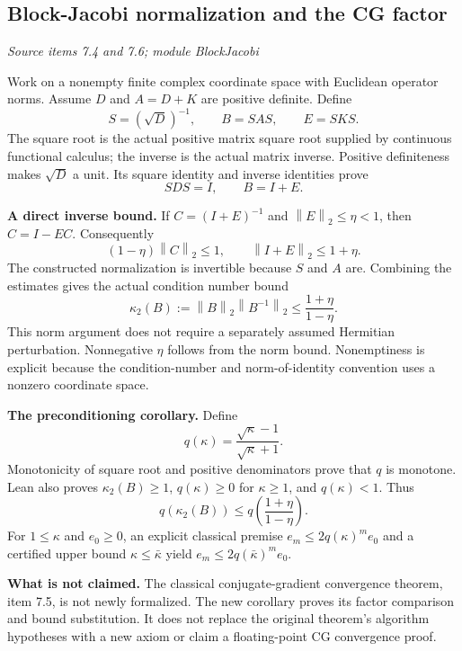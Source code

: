 \documentclass[11pt,letterpaper]{article}
\theoremstyle{definition}
\theoremstyle{remark}
\newcommand{\norm}[1]{\left\lVert#1\right\rVert}\newcommand{\abs}[1]{\left\lvert#1\right\rvert}
\begin{document}
\subsection{Block-Jacobi normalization and the CG factor}\label{supp5:subsection:006}\textit{Source items 7.4 and 7.6; module BlockJacobi}\par
Work on a nonempty finite complex coordinate space with Euclidean operator norms. Assume $D$ and $A=D+K$ are positive definite. Define
\[
S=(\sqrt D)^{-1},\qquad B=SAS,\qquad E=SKS.
\]
The square root is the actual positive matrix square root supplied by continuous functional calculus; the inverse is the actual matrix inverse. Positive definiteness makes $\sqrt D$ a unit. Its square identity and inverse identities prove
\[
SDS=I,\qquad B=I+E.
\]

\textbf{A direct inverse bound.} If $C=(I+E)^{-1}$ and $\norm E_2\leq\eta<1$, then $C=I-EC$. Consequently
\[
(1-\eta)\norm C_2\leq 1,
\qquad \norm{I+E}_2\leq 1+\eta.
\]
The constructed normalization is invertible because $S$ and $A$ are. Combining the estimates gives the actual condition number bound
\[
\boxed{\kappa_2(B):=\norm B_2\norm{B^{-1}}_2
\leq\frac{1+\eta}{1-\eta}.}
\]
This norm argument does not require a separately assumed Hermitian perturbation. Nonnegative $\eta$ follows from the norm bound. Nonemptiness is explicit because the condition-number and norm-of-identity convention uses a nonzero coordinate space.

\textbf{The preconditioning corollary.} Define
\[
q(\kappa)=\frac{\sqrt\kappa-1}{\sqrt\kappa+1}.
\]
Monotonicity of square root and positive denominators prove that $q$ is monotone. Lean also proves $\kappa_2(B)\geq1$, $q(\kappa)\geq0$ for $\kappa\geq1$, and $q(\kappa)<1$. Thus
\[
\boxed{q(\kappa_2(B))\leq q\!\left(\frac{1+\eta}{1-\eta}\right).}
\]
For $1\leq\kappa$ and $e_0\geq0$, an explicit classical premise $e_m\leq2q(\kappa)^m e_0$ and a certified upper bound $\kappa\leq\bar\kappa$ yield $e_m\leq2q(\bar\kappa)^m e_0$.

\textbf{What is not claimed.} The classical conjugate-gradient convergence theorem, item 7.5, is not newly formalized. The new corollary proves its factor comparison and bound substitution. It does not replace the original theorem's algorithm hypotheses with a new axiom or claim a floating-point CG convergence proof.
\end{document}
